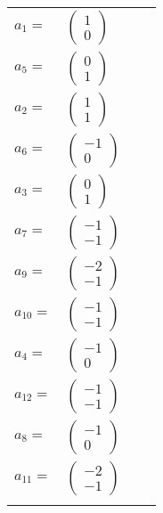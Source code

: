 \documentclass[1p]{elsarticle_modified}
\theoremstyle{definition}
\begin{document}
\begin{tabular}{m{7pt} m{180pt} m{7pt} m{180pt} }
\flushright $a_{1}=$&$\begin{pmatrix}1\\0\end{pmatrix}$ \\
\flushright $a_{5}=$&$\begin{pmatrix}0\\1\end{pmatrix}$ \\
\flushright $a_{2}=$&$\begin{pmatrix}1\\1\end{pmatrix}$ \\
\flushright $a_{6}=$&$\begin{pmatrix}-1\\0\end{pmatrix}$ \\
\flushright $a_{3}=$&$\begin{pmatrix}0\\1\end{pmatrix}$ \\
\flushright $a_{7}=$&$\begin{pmatrix}-1\\-1\end{pmatrix}$ \\
\flushright $a_{9}=$&$\begin{pmatrix}-2\\-1\end{pmatrix}$ \\
\flushright $a_{10}=$&$\begin{pmatrix}-1\\-1\end{pmatrix}$ \\
\flushright $a_{4}=$&$\begin{pmatrix}-1\\0\end{pmatrix}$ \\
\flushright $a_{12}=$&$\begin{pmatrix}-1\\-1\end{pmatrix}$ \\
\flushright $a_{8}=$&$\begin{pmatrix}-1\\0\end{pmatrix}$ \\
\flushright $a_{11}=$&$\begin{pmatrix}-2\\-1\end{pmatrix}$\\&\end{tabular}
\end{document}
